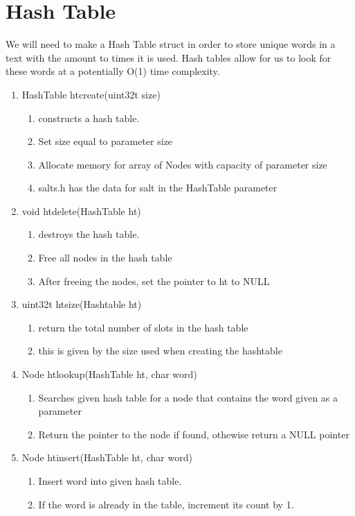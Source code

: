 \documentclass[11pt]{article}
\begin{document}
\section{Hash Table}\label{ss:Hashtable}
We will need to make a Hash Table struct in order to store unique words in a text with the amount to times it is used. Hash tables allow for us to look for these words at a potentially O(1) time complexity.
\begin{enumerate}
\item HashTable htcreate(uint32t size)
	\begin{enumerate}
	\item constructs a hash table.
	\item Set size equal to parameter size
	\item Allocate memory for array of Nodes with capacity of parameter size
	\item salts.h has the data for salt in the HashTable parameter
	\end{enumerate}
\item void htdelete(HashTable ht)
	\begin{enumerate}
	\item destroys the hash table.
	\item Free all nodes in the hash table
	\item After freeing the nodes, set the pointer to ht to NULL
	\end{enumerate}
\item uint32t htsize(Hashtable ht)
	\begin{enumerate}
	\item return the total number of slots in the hash table
	\item this is given by the size used when creating the hashtable
	\end{enumerate}
\item Node htlookup(HashTable ht, char word)
	\begin{enumerate}
	\item Searches given hash table for a node that contains the word given as a parameter
	\item Return the pointer to the node if found, othewise return a NULL pointer
	\end{enumerate}
\item Node htinsert(HashTable ht, char word)
	\begin{enumerate}
	\item Insert word into given hash table.
	\item If the word is already in the table, increment its count by 1.

\end{enumerate}
\end{enumerate}
\end{document}
